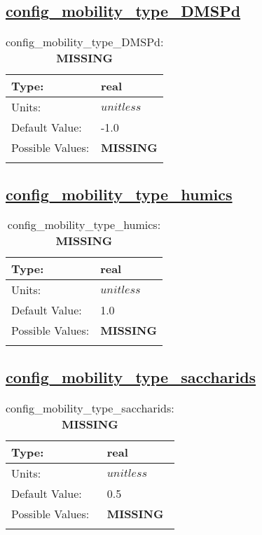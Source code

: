 \subsection[config\_mobility\_type\_DMSPd]{\hyperref[sec:nm_tab_biogeochemistry]{config\_mobility\_type\_DMSPd}}
\label{subsec:nm_sec_config_mobility_type_DMSPd}
\begin{center}
\begin{longtable}{| p{2.0in} || p{4.0in} |}
    \hline
    Type: & real \\
    \hline
    Units: & $unitless$ \\
    \hline
    Default Value: & -1.0 \\
    \hline
    Possible Values: & {\bf \color{red} MISSING} \\
    \hline
    \caption{config\_mobility\_type\_DMSPd: {\bf \color{red} MISSING}}
\end{longtable}
\end{center}
\subsection[config\_mobility\_type\_humics]{\hyperref[sec:nm_tab_biogeochemistry]{config\_mobility\_type\_humics}}
\label{subsec:nm_sec_config_mobility_type_humics}
\begin{center}
\begin{longtable}{| p{2.0in} || p{4.0in} |}
    \hline
    Type: & real \\
    \hline
    Units: & $unitless$ \\
    \hline
    Default Value: & 1.0 \\
    \hline
    Possible Values: & {\bf \color{red} MISSING} \\
    \hline
    \caption{config\_mobility\_type\_humics: {\bf \color{red} MISSING}}
\end{longtable}
\end{center}
\subsection[config\_mobility\_type\_saccharids]{\hyperref[sec:nm_tab_biogeochemistry]{config\_mobility\_type\_saccharids}}
\label{subsec:nm_sec_config_mobility_type_saccharids}
\begin{center}
\begin{longtable}{| p{2.0in} || p{4.0in} |}
    \hline
    Type: & real \\
    \hline
    Units: & $unitless$ \\
    \hline
    Default Value: & 0.5 \\
    \hline
    Possible Values: & {\bf \color{red} MISSING} \\
    \hline
    \caption{config\_mobility\_type\_saccharids: {\bf \color{red} MISSING}}
\end{longtable}
\end{center}
